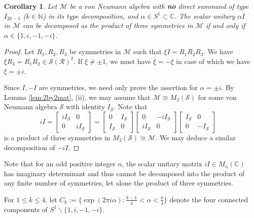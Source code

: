 \documentclass[12pt, preprint]{amsart}
\newtheorem{cor}[thm]{Corollary}
\newcommand{\C}{\mathbb{C}}
\newcommand{\N}{\mathbb{N}}
\theoremstyle{definition}
\theoremstyle{remark}
\numberwithin{equation}{section}
\theoremstyle{ser}
\theoremstyle{serr}
\theoremstyle{ser}
\begin{document}
\begin{cor}
\label{cor:prod_three_sym}
Let $\mathscr{M}$ be a von Neumann algebra with {\bf no} direct summand of type $I_{2k-1}$ ($k \in \N$) in its type decomposition, and $\alpha \in S^1 \subset \mathbb{C}$. The scalar unitary $\alpha I$ in $\mathscr{M}$ can be decomposed as the product of three symmetries in $\mathscr{M}$ if and only if $\alpha \in \{1, i, -1, -i \}$. 
\end{cor}
\begin{proof}
Let $R_1, R_2, R_3$ be symmetries in $\mathscr{M}$ such that $\xi I = R_1 R_2 R_3$. We have $\xi R_3 = R_1 R_2 \in \mathcal{S}(\mathscr{R})^2$. If $\xi \ne \pm 1$, we must have $\overline{\xi} = - \xi$ in case of which we have $\xi = \pm i $.

Since $I, -I$ are symmetries, we need only prove the assertion for $\alpha = \pm i $. By Lemma \ref{lem:2by2mat}, (ii), we may assume that $\mathscr{M}\cong M_2(\mathscr{S})$ for some von Neumann algebra $\mathscr{S}$ with identity $I_{\mathscr{S}}$. Note that
$$
i I = 
\begin{bmatrix}
i I_{\mathscr{S}} & 0\\
0 & i I_{\mathscr{S}}
\end{bmatrix} = 
\begin{bmatrix}
0 & I_{\mathscr{S}}\\
I_{\mathscr{S}} & 0
\end{bmatrix}
\begin{bmatrix}
0 & -i I_{\mathscr{S}}\\
i I_{\mathscr{S}} & 0
\end{bmatrix}
\begin{bmatrix}
I_{\mathscr{S}} & 0\\
0 & -I_{\mathscr{S}}
\end{bmatrix}
$$
is a product of three symmetries in $M_2(\mathscr{S}) \cong \mathscr{M}$. We may deduce a similar decomposition of $-i I$.
\end{proof}

Note that for an odd positive integer $n$, the scalar unitary matrix $iI \in M_n(\C)$ has imaginary determinant and thus cannot be decomposed into the product of any finite number of symmetries, let alone the product of three symmetries.

For $1 \le k \le 4$, let $C_k := \big\{ \exp (2 \pi i \alpha) : \frac{k-1}{4} < \alpha < \frac{k}{4} \big\}$ denote the four connected components of $S^1 \backslash \{ 1, i, -1, -i \}$.
\end{document}
